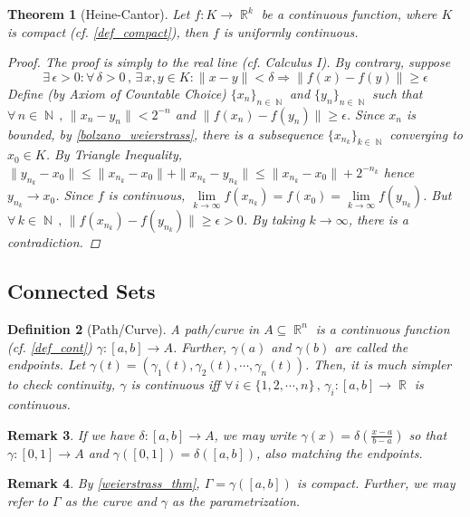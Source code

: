 \documentclass[12pt]{article}
\let\RA\Rightarrow
\let\ee\epsilon
\newcommand{\Forall}[1]{\forall\,{#1}\,,\,}
\newcommand{\Exist}[1]{\exists\,{#1}:}
\DeclareMathOperator{\R}{\mathbb{R}}
\DeclareMathOperator{\N}{\mathbb{N}}
\newcommand{\seq}[2]{\{{#1}\}_{#2\in\N}}
\newtheorem{theorem}{Theorem}[subsection]
\newtheorem{definition}[theorem]{Definition}
\newtheorem{remark}[theorem]{Remark}
\begin{document}
\begin{theorem}[Heine-Cantor]
  Let $f:K\to \R^k$ be a continuous function, where $K$ is compact (cf. \ref{def_compact}), then $f$ is uniformly continuous.
  \begin{proof}
    The proof is simply to the real line (cf. Calculus I). By contrary, suppose $$\Exist{\ee>0}\Forall{\delta>0}\Exist{x,y\in K}\|x-y\|<\delta\RA \|f(x)-f(y)\|\geq\ee$$
    Define (by Axiom of Countable Choice) $\seq{x_n}{n}$ and $\seq{y_n}{n}$ such that $\Forall{n\in\N}\|x_n-y_n\|<2^{-n}$ and $\|f(x_n)-f(y_n)\|\geq\ee$. Since $x_n$ is bounded, by \ref{bolzano_weierstrass}, there is a subsequence $\seq{x_{n_k}}{k}$ converging to $x_0\in K$. By Triangle Inequality, $\|y_{n_k}-x_0\|\leq \|x_{n_k}-x_0\|+\|x_{n_k}-y_{n_k}\|\leq \|x_{n_k}-x_0\|+2^{-n_k}$ hence $y_{n_k}\to x_0$. Since $f$ is continuous, $\lim\limits_{k\to\infty}f(x_{n_k})=f(x_0)=\lim\limits_{k\to\infty}f(y_{n_k})$. But $\Forall{k\in\N}\|f(x_{n_k})-f(y_{n_k})\|\geq \ee>0$. By taking $k\to\infty$, there is a contradiction.
  \end{proof}
\end{theorem}

\pagebreak

\subsection{Connected Sets}

\begin{definition}[Path/Curve]
  \label{def_path}
  A path/curve in $A\subseteq \R^n$ is a continuous function (cf. \ref{def_cont}) $\gamma:[a,b]\to A$. Further, $\gamma(a)$ and $\gamma(b)$ are called the endpoints. Let $\gamma(t)=(\gamma_1(t),\gamma_2(t),\cdots,\gamma_n(t))$. Then, it is much simpler to check continuity, $\gamma$ is continuous iff $\Forall{i\in\{1,2,\cdots,n\}}\gamma_i:[a,b]\to \R$ is continuous.
\end{definition}

\begin{remark}
  If we have $\delta:[a,b]\to A$, we may write $\gamma(x)=\delta\left(\frac{x-a}{b-a}\right)$ so that $\gamma:[0,1]\to A$ and $\gamma([0,1])=\delta([a,b])$, also matching the endpoints.
\end{remark}

\begin{remark}
  By \ref{weierstrass_thm}, $\Gamma=\gamma([a,b])$ is compact. Further, we may refer to $\Gamma$ as the curve and $\gamma$ as the parametrization.
\end{remark}
\end{document}
